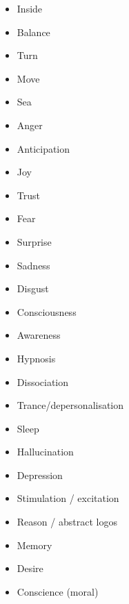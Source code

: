 \documentclass[a5,landscape]{article}
\begin{document}
{\begin{multicols}{4}
\begin{itemize}
\item   Inside 

\item   Balance 

\item   Turn 

\item   Move 

\item   Sea 

\item   Anger 

\item   Anticipation 

\item   Joy 

\item   Trust 

\item   Fear 

\item   Surprise 

\item   Sadness 

\item   Disgust 

\item   Consciousness 

\item   Awareness 

\item   Hypnosis 

\item   Dissociation 

\item   Trance/depersonalisation 

\item   Sleep 

\item   Hallucination 

\item   Depression 

\item   Stimulation / excitation 

\item   Reason / abstract logos  

\item   Memory 

\item   Desire 

\item   Conscience (moral) 


\end{itemize}
\end{multicols}}
\end{document}

